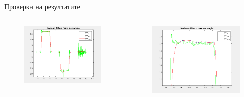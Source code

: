 \documentclass[handout]{beamer}
\begin{document}
\begin{frame}{Проверка на резултатите}
	\begin{columns}
		\begin{figure}[htpb!]
			\centering
			\includegraphics[width=\textwidth]{Images/kalman_filter_time_vs_raw.png}

		\end{figure}
		

		\begin{figure}[htpb!]
			\centering
			\includegraphics[width=\textwidth]{Images/kalman_filter_time_vs_raw_2.png}

		\end{figure}
	\end{columns}
\end{frame}
\end{document}
